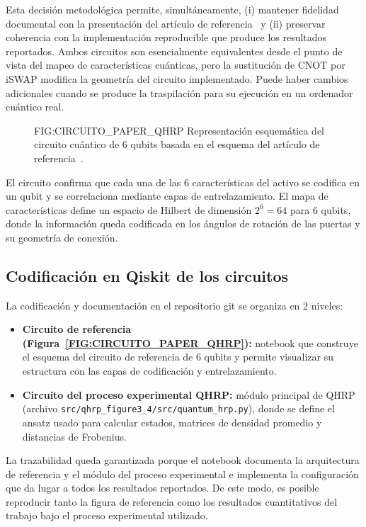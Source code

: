 Esta decisión metodológica permite, simultáneamente, (i) mantener fidelidad documental con la presentación del artículo de referencia~\cite{arian2025qhrp} y (ii) preservar coherencia con la implementación reproducible que produce los resultados reportados. Ambos circuitos son esencialmente equivalentes desde el punto de vista del mapeo de características cuánticas, pero la sustitución de CNOT por iSWAP modifica la geometría del circuito implementado. Puede haber cambios adicionales cuando se produce la traspilación para su ejecución en un ordenador cuántico real.

\begin{figure}[Circuito cuántico reproducido del artículo de referencia]{FIG:CIRCUITO_PAPER_QHRP}
{Representación esquemática del circuito cuántico de 6 qubits basada en el esquema del artículo de referencia~\cite{arian2025qhrp}.}
\end{figure}

El circuito confirma que cada una de las 6 características del activo se codifica en un qubit y se correlaciona mediante capas de entrelazamiento. El mapa de características define un espacio de Hilbert de dimensión $2^6=64$ para 6 qubits, donde la información queda codificada en los ángulos de rotación de las puertas y su geometría de conexión.

\subsection{Codificación en Qiskit de los circuitos}
\label{subsec:codificacion_qiskit_circuitos}

La codificación y documentación en el repositorio git se organiza en 2 niveles:
\begin{itemize}
\item \textbf{Circuito de referencia (Figura~\ref{FIG:CIRCUITO_PAPER_QHRP}):} notebook que construye el esquema del circuito de referencia de 6 qubits y permite visualizar su estructura con las capas de codificación y entrelazamiento.
\item \textbf{Circuito del proceso experimental \gls{QHRP}:} módulo principal de QHRP (archivo \texttt{src/qhrp\_figure3\_4/src/quantum\_hrp.py}), donde se define el ansatz usado para calcular estados, matrices de densidad promedio y distancias de Frobenius.
\end{itemize}

La trazabilidad queda garantizada porque el notebook documenta la arquitectura de referencia y el módulo del proceso experimental e implementa la configuración que da lugar a todos los resultados reportados. De este modo, es posible reproducir tanto la figura de referencia como los resultados cuantitativos del trabajo bajo el proceso experimental utilizado.

